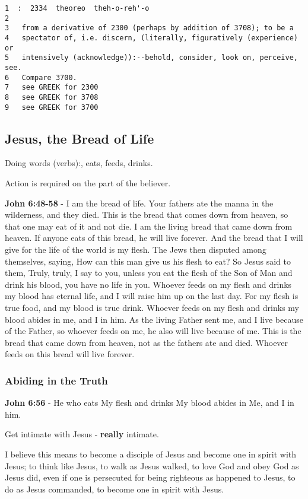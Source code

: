 \documentclass[11pt]{article}
\begin{document}
\begin{verbatim}
1  :  2334  theoreo  theh-o-reh'-o
2  
3   from a derivative of 2300 (perhaps by addition of 3708); to be a
4   spectator of, i.e. discern, (literally, figuratively (experience) or
5   intensively (acknowledge)):--behold, consider, look on, perceive, see.
6   Compare 3700.
7   see GREEK for 2300
8   see GREEK for 3708
9   see GREEK for 3700
\end{verbatim}

\subsection{Jesus, the Bread of Life}
\label{sec:org79d7892}
Doing words (verbs):, eats, feeds, drinks.

Action is required on the part of the believer.

\textbf{John 6:48-58} - I am the bread of life. Your fathers ate the manna in the wilderness, and they died. This is the bread that comes down from heaven, so that one may eat of it and not die. I am the living bread that came down from heaven. If anyone eats of this bread, he will live forever. And the bread that I will give for the life of the world is my flesh. The Jews then disputed among themselves, saying, How can this man give us his flesh to eat? So Jesus said to them, Truly, truly, I say to you, unless you eat the flesh of the Son of Man and drink his blood, you have no life in you. Whoever feeds on my flesh and drinks my blood has eternal life, and I will raise him up on the last day. For my flesh is true food, and my blood is true drink. Whoever feeds on my flesh and drinks my blood abides in me, and I in him. As the living Father sent me, and I live because of the Father, so whoever feeds on me, he also will live because of me. This is the bread that came down from heaven, not as the fathers ate and died. Whoever feeds on this bread will live forever.

\subsubsection{Abiding in the Truth}
\label{sec:orgddf96b6}
\textbf{John 6:56} - He who eats My flesh and drinks My blood abides in Me, and I in him.

Get intimate with Jesus - \textbf{really} intimate.

I believe this means to become a disciple of Jesus and become one in spirit with Jesus; to think like Jesus, to walk as Jesus walked, to love God and obey God as Jesus did, even if one is persecuted for being righteous as happened to Jesus, to do as Jesus commanded, to become one in spirit with Jesus.
\end{document}
